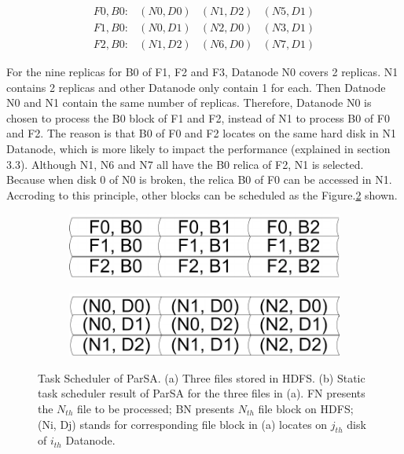 \documentclass[preprint,12pt]{elsarticle}
\begin{document}
$$\begin{array} {lcrr}
F0,B0: & (N0,D0) & (N1,D2) & (N5,D1) \\
F1,B0: & (N0,D1) & (N2,D0) & (N3,D1) \\
F2,B0: & (N1,D2) & (N6,D0) & (N7,D1)
\end{array}$$

For the nine replicas for B0 of F1, F2 and F3, Datanode N0 covers 2 replicas. N1 contains 2 replicas and other Datanode only contain 1 for 
each. Then Datnode N0 and N1 contain the same number of replicas. Therefore, Datanode N0 is chosen to process the B0 block of F1 and F2,
instead of N1 to process B0 of F0 and F2. The reason is that B0 of F0 and F2 locates on the same hard disk in N1 Datanode, which is more 
likely to impact the performance (explained in section 3.3). Although N1, N6 and N7 all have the B0 relica of F2, N1 is selected. 
Because when disk 0 of N0 is broken, the relica B0 of F0 can be accessed in N1. Accroding to this principle, other blocks can be scheduled
as the Figure.\ref{figure5b} shown.

\begin{figure}[htb]
    \centering
    \begin{subfigure}{.5\textwidth}
        \includegraphics[width=\textwidth]{figure5a}
        \caption{}
        \label{figure5a}
    \end{subfigure}

    \begin{subfigure}{.5\textwidth}
        \centering
        \includegraphics[width=\textwidth]{figure5b}%
        \caption{}
        \label{figure5b}
    \end{subfigure}
    \caption{Task Scheduler of ParSA. (a) Three files stored in HDFS. (b) Static task scheduler result of ParSA for the three files in (a). FN presents the $N_{th}$ file to be processed; BN presents $N_{th}$ file block on HDFS; (Ni, Dj) stands for corresponding file block 
    in (a) locates on $j_{th}$ disk of $i_{th}$ Datanode.}
    \label{figure5}
\end{figure}
\end{document}
